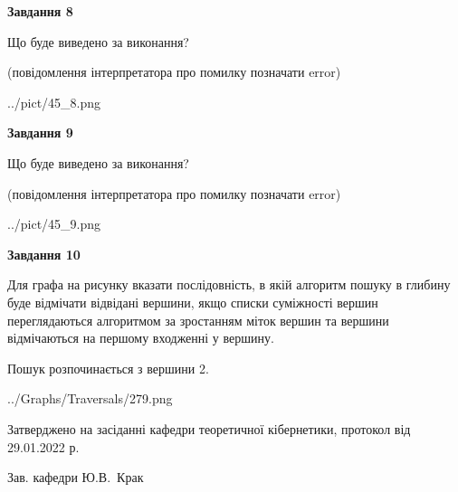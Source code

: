 \documentclass[12pt, ukrainian]{article}
\begin{document}
{\begin {large}
{\begin {center}\textbf{Завдання 8}\end {center}}\par
Що буде виведено за виконання?\par
 (повідомлення інтерпретатора про помилку позначати error)
\begin{center}
	{../pict/45_8.png}
\end{center}
\newpage

{\begin {center}\textbf{Завдання 9}\end {center}}\par
Що буде виведено за виконання?\par
 (повідомлення інтерпретатора про помилку позначати error)\par
\begin{center}
	{../pict/45_9.png}
\end{center}
\newpage

{\begin {center}\textbf{Завдання 10}\end {center}}\par
Для графа на рисунку вказати послідовність, в якій алгоритм пошуку в глибину буде відмічати відвідані вершини, якщо списки суміжності вершин переглядаються алгоритмом за зростанням міток вершин та вершини відмічаються на першому вход\-женні у вершину.\par
Пошук розпочинається з вершини 2.\par

\begin{center}
	{../Graphs/Traversals/279.png}
\end{center}\par
\newpage


\end {large}
}
{\smallskip \begin {small} Затверджено на засіданні кафедри теоретичної кібернетики, протокол  від   29.01.2022 р.\par\smallskip\smallskip
{\parbox {6.5 cm}{Зав. кафедри \dotfill Ю.В.~Крак}} \end{small}}
\end{document}

